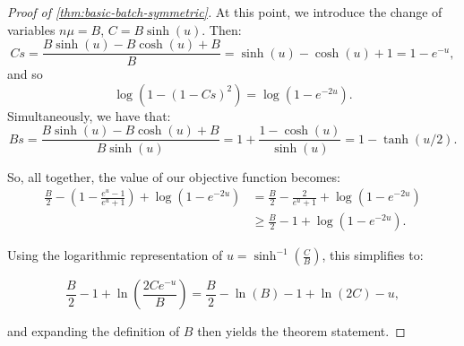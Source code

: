 \documentclass[10pt,a4paper]{amsart}
\begin{document}
\begin{proof}[Proof of \cref{thm:basic-batch-symmetric}]
    At this point, we introduce the change of variables $n\mu = B$, $C = B \sinh(u)$. Then:
    \begin{equation*}
        Cs = \frac{B \sinh(u) - B\cosh(u) + B}{B} = \sinh(u) - \cosh(u) + 1 = 1-e^{-u},
    \end{equation*}
    and so
    \begin{equation*}
        \log(1-(1-Cs)^2) = \log(1-e^{-2u}).
    \end{equation*}
    Simultaneously, we have that:
    \begin{equation*}
        Bs = \frac{B\sinh(u) - B\cosh(u) + B}{B\sinh(u)} = 1+\frac{1-\cosh(u)}{\sinh(u)} = 1 - \tanh(u/2).
    \end{equation*}

    So, all together, the value of our objective function becomes:
    \begin{align*}
        \frac{B}{2} - \left(1-\frac{e^u-1}{e^u+1}\right) + \log(1-e^{-2u})
        &= \frac{B}{2} - \frac{2}{e^u+1} + \log(1-e^{-2u}) \\
        &\geq \frac{B}{2} - 1 + \log(1-e^{-2u}).
    \end{align*}

    Using the logarithmic representation of $u = \sinh^{-1}\left( \frac{C}{B} \right)$, this simplifies to:

    \begin{equation*}
        \frac{B}{2}-1+\ln \left(\frac{2C e^{-u}}{B}\right) = \frac{B}{2} - \ln(B) -1 +\ln \left(2C\right) - u,
    \end{equation*}

    and expanding the definition of $B$ then yields the theorem statement.
\end{proof}
\end{document}
